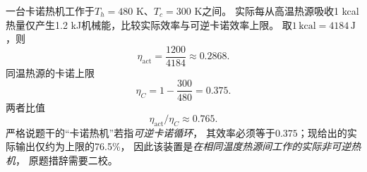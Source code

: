 \problemtext 一台卡诺热机工作于$T_h=480$ K、$T_c=300$ K之间。
实际每从高温热源吸收1 kcal热量仅产生1.2 kJ机械能，比较实际效率与可逆卡诺效率上限。
\workings
取$1\,\mathrm{kcal}=4184\,\mathrm J$，则
\[
\boxed{\eta_{\mathrm{act}}=\frac{1200}{4184}
\approx0.2868}.
\]
同温热源的卡诺上限
\[
\boxed{\eta_C=1-\frac{300}{480}=0.375}.
\]
两者比值
\[
\boxed{\eta_{\mathrm{act}}/\eta_C\approx0.765}.
\]
\crosscheck 严格说题干的“卡诺热机”若指\emph{可逆卡诺循环}，
其效率必须等于$0.375$；现给出的实际输出仅约为上限的76.5\%，
因此该装置是\emph{在相同温度热源间工作的实际非可逆热机}，
原题措辞需要二校。
